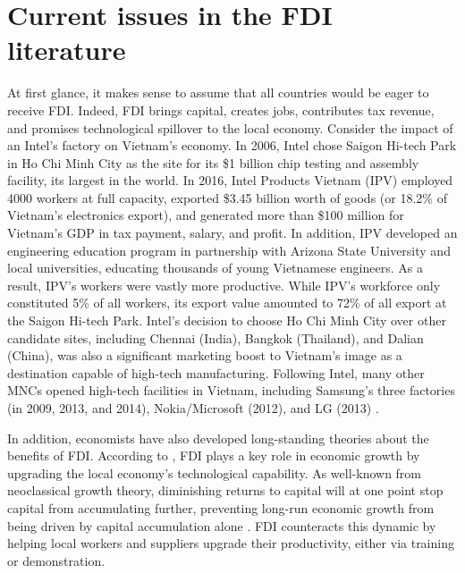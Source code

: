 \chapter{Current issues in the FDI literature}
\label{chap:literature_issues}

At first glance, it makes sense to assume that all countries would be eager to
receive FDI. Indeed, FDI brings capital, creates jobs, contributes tax revenue,
and promises technological spillover to the local economy. Consider the impact
of an Intel's factory on Vietnam's economy. In 2006, Intel chose Saigon Hi-tech
Park in Ho Chi Minh City as the site for its \$1 billion chip testing and
assembly facility, its largest in the world. In 2016, Intel Products Vietnam
(IPV) employed 4000 workers at full capacity, exported \$3.45 billion worth of
goods (or 18.2\% of Vietnam's electronics export), and generated more than \$100
million for Vietnam's GDP in tax payment, salary, and profit. In addition, IPV
developed an engineering education program in partnership with Arizona State
University and local universities, educating thousands of young Vietnamese
engineers. As a result, IPV's workers were vastly more productive. While IPV's
workforce only constituted 5\% of all workers, its export value amounted to 72\%
of all export at the Saigon Hi-tech Park. Intel's decision to choose Ho Chi Minh
City over other candidate sites, including Chennai (India), Bangkok (Thailand),
and Dalian (China), was also a significant marketing boost to Vietnam's image as
a destination capable of high-tech manufacturing. Following Intel, many other
MNCs opened high-tech facilities in Vietnam, including Samsung's three factories
(in 2009, 2013, and 2014), Nokia/Microsoft (2012), and LG (2013)
\citep{Dinh2016, UNCTAD2008}.

In addition, economists have also developed long-standing theories about the
benefits of FDI. According to \citet{Findlay1978}, FDI plays a key
role in economic growth by upgrading the local economy's technological
capability. As well-known from neoclassical growth theory, diminishing returns
to capital will at one point stop capital from accumulating further, preventing
long-run economic growth from being driven by capital accumulation alone
\citep{Solow1956}. FDI counteracts this dynamic by helping local workers and
suppliers upgrade their productivity, either via training or demonstration.

